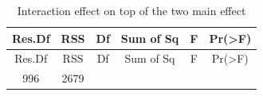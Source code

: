 \documentclass[]{article}
\begin{document}
\begin{longtable}[]{@{}cccccc@{}}
\caption{Interaction effect on top of the two main
effect}\tabularnewline
\toprule
\begin{minipage}[b]{0.10\columnwidth}\centering\strut
Res.Df\strut
\end{minipage} & \begin{minipage}[b]{0.08\columnwidth}\centering\strut
RSS\strut
\end{minipage} & \begin{minipage}[b]{0.06\columnwidth}\centering\strut
Df\strut
\end{minipage} & \begin{minipage}[b]{0.14\columnwidth}\centering\strut
Sum of Sq\strut
\end{minipage} & \begin{minipage}[b]{0.09\columnwidth}\centering\strut
F\strut
\end{minipage} & \begin{minipage}[b]{0.13\columnwidth}\centering\strut
Pr(\textgreater{}F)\strut
\end{minipage}\tabularnewline
\midrule
\endfirsthead
\toprule
\begin{minipage}[b]{0.10\columnwidth}\centering\strut
Res.Df\strut
\end{minipage} & \begin{minipage}[b]{0.08\columnwidth}\centering\strut
RSS\strut
\end{minipage} & \begin{minipage}[b]{0.06\columnwidth}\centering\strut
Df\strut
\end{minipage} & \begin{minipage}[b]{0.14\columnwidth}\centering\strut
Sum of Sq\strut
\end{minipage} & \begin{minipage}[b]{0.09\columnwidth}\centering\strut
F\strut
\end{minipage} & \begin{minipage}[b]{0.13\columnwidth}\centering\strut
Pr(\textgreater{}F)\strut
\end{minipage}\tabularnewline
\midrule
\endhead
\begin{minipage}[t]{0.10\columnwidth}\centering\strut
996\strut
\end{minipage} & \begin{minipage}[t]{0.08\columnwidth}\centering\strut
2679\strut
\end{minipage} & \begin{minipage}[t]{0.06\columnwidth}\centering\strut

\end{minipage}
\end{longtable}
\end{document}
